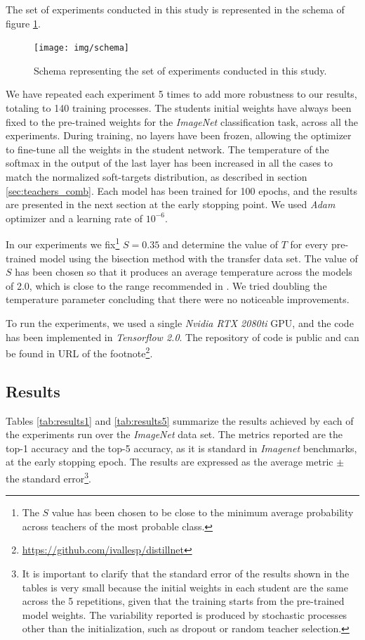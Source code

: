 \documentclass{elsarticle}
\begin{document}
	The set of experiments conducted in this study is represented in the schema of figure \ref{fig:schema}.

\begin{figure}[h!]
	\centering
	\texttt{[image: img/schema]}
	\caption{Schema representing the set of experiments conducted in this study.}
	\label{fig:schema}
\end{figure}


	We have repeated each experiment 5 times to add more robustness to our results, totaling to 140 training processes. The students initial weights have always been fixed to the pre-trained weights for the \textit{ImageNet} classification task, across all the experiments. During training, no layers have been frozen, allowing the optimizer to fine-tune all the weights in the student network. The temperature of the softmax in the output of the last layer has been increased in all the cases to match the normalized soft-targets distribution, as described in section \ref{sec:teachers_comb}.  Each model has been trained for 100 epochs, and the results are presented in the next section at the early stopping point. We used \textit{Adam} optimizer \citep{Kingma14} and a learning rate of $10^{-6}$.

	 In our experiments we fix\footnote{The $S$ value has been chosen to be close to the minimum average probability across teachers of the most probable class.} $S=0.35$ and determine the value of $T$ for every pre-trained model using the bisection method with the transfer data set. The value of $S$ has been chosen so that it produces an average temperature across the models of 2.0, which is close to the range recommended in \citep{hinton2015}. We tried doubling the temperature parameter concluding that there were no noticeable improvements.

	 To run the experiments, we used a single \textit{Nvidia RTX 2080ti} GPU, and the code has been implemented in \textit{Tensorflow 2.0}. The repository of code is public and can be found in URL of the footnote\footnote{\url{https://github.com/ivallesp/distillnet}}.

	\subsection{Results}  \label{sec:results}
	Tables \ref{tab:results1} and \ref{tab:results5} summarize the results achieved by each of the experiments run over the \textit{ImageNet} data set. The metrics reported are the top-1 accuracy and the top-5 accuracy, as it is standard in \textit{Imagenet} benchmarks, at the early stopping epoch. The results are expressed as the average metric $\pm$ the standard error\footnote{It is important to clarify that the standard error of the results shown in the tables is very small because the initial weights in each student are the same across the 5 repetitions, given that the training starts from the pre-trained model weights. The variability reported is produced by stochastic processes other than the initialization, such as dropout or random teacher selection.}.
\end{document}

